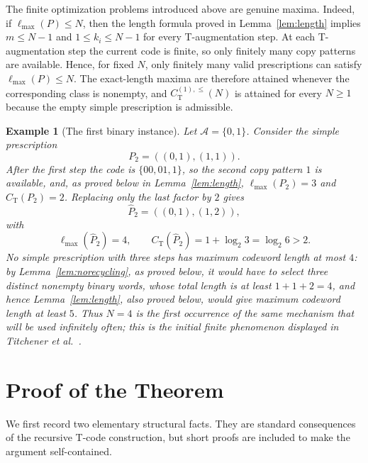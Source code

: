 \documentclass[11pt]{article}
\newtheorem{example}{Example}
\newcommand{\A}{\mathcal A}
\newcommand{\CT}{C_{\mathrm T}}
\newcommand{\CTsimpenv}{C_{\mathrm T}^{(1),\leq}}
\newcommand{\ellmax}{\ell_{\max}}
\begin{document}
The finite optimization problems introduced above are genuine maxima. Indeed, if $\ellmax(P)\leq N$, then the length formula proved in Lemma~\ref{lem:length} implies $m\leq N-1$ and $1\leq k_i\leq N-1$ for every T-augmentation step. At each T-augmentation step the current code is finite, so only finitely many copy patterns are available. Hence, for fixed $N$, only finitely many valid prescriptions can satisfy $\ellmax(P)\leq N$. The exact-length maxima are therefore attained whenever the corresponding class is nonempty, and $\CTsimpenv(N)$ is attained for every $N\geq 1$ because the empty simple prescription is admissible.

\begin{example}[The first binary instance]
\label{ex:binary}
Let $\A=\{0,1\}$. Consider the simple prescription
\begin{equation}
P_2=((0,1),(1,1)).
\end{equation}
After the first step the code is $\{00,01,1\}$, so the second copy pattern $1$ is available, and, as proved below in Lemma~\ref{lem:length}, $\ellmax(P_2)=3$ and $\CT(P_2)=2$. Replacing only the last factor by $2$ gives
\begin{equation}
\widehat P_2=((0,1),(1,2)),
\end{equation}
with
\begin{equation}
\ellmax(\widehat P_2)=4,
\qquad
\CT(\widehat P_2)=1+\log_2 3=\log_2 6>2.
\end{equation}
No simple prescription with three steps has maximum codeword length at most $4$: by Lemma~\ref{lem:norecycling}, as proved below, it would have to select three distinct nonempty binary words, whose total length is at least $1+1+2=4$, and hence Lemma~\ref{lem:length}, also proved below, would give maximum codeword length at least $5$. Thus $N=4$ is the first occurrence of the same mechanism that will be used infinitely often; this is the initial finite phenomenon displayed in Titchener et al.~\cite[Sec.~11]{TitchenerEtAl2005}.
\end{example}

\section{Proof of the Theorem}
\label{sec:proof}

We first record two elementary structural facts. They are standard consequences of the recursive T-code construction, but short proofs are included to make the argument self-contained.
\end{document}
